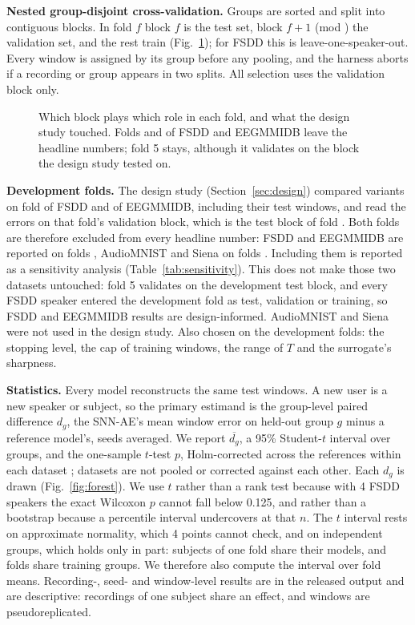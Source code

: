 \documentclass[conference]{IEEEtran}
\begin{document}
\par \textbf{Nested group-disjoint cross-validation.} Groups are sorted and split into \cfgFolds{}
contiguous blocks. In fold $f$ block $f$ is the test set, block $f{+}1$ (mod \cfgFolds) the
validation set, and the rest train (Fig.~\ref{fig:folds}); for FSDD this is
leave-one-speaker-out. Every window is assigned by its group before any pooling, and the harness
aborts if a recording or group appears in two splits. All selection uses the validation block
only.

\begin{figure}[!t]
  \centering
  
  \caption{Which block plays which role in each fold, and what the design study touched. Folds
  \cfgDevFoldsFsdd{} and \cfgDesignFoldsFsdd{} of FSDD and EEGMMIDB leave the headline numbers;
  fold 5 stays, although it validates on the block the design study tested on.}
  \label{fig:folds}
\end{figure}

\par \textbf{Development folds.} The design study (Section~\ref{sec:design}) compared variants
on fold \cfgDevFoldsFsdd{} of FSDD and of EEGMMIDB, including their test windows, and read the
errors on that fold's validation block, which is the test block of fold \cfgDesignFoldsFsdd.
Both folds are therefore excluded from every headline number: FSDD and EEGMMIDB are reported on
folds \cfgHeadlineFoldsFsdd, AudioMNIST and Siena on folds \cfgHeadlineFoldsSiena. Including them
is reported as a sensitivity analysis (Table~\ref{tab:sensitivity}). This does not make those
two datasets untouched: fold 5 validates on the development test block, and every FSDD speaker
entered the development fold as test, validation or training, so FSDD and EEGMMIDB results are
design-informed. AudioMNIST and Siena were not used in the design study. Also chosen on the
development folds: the stopping level, the cap of \cfgTrainWindows{} training windows, the range
of $T$ and the surrogate's sharpness.

\par \textbf{Statistics.} Every model reconstructs the same test windows. A new user is a new
speaker or subject, so the primary estimand is the group-level paired difference $d_g$, the
SNN-AE's mean window error on held-out group $g$ minus a reference model's, seeds averaged. We
report $\overline{d_g}$, a 95\% Student-$t$ interval over groups, and the one-sample $t$-test
$p$, Holm-corrected across the \cfgHolmRefs{} references within each dataset
\cite{holm1979simple}; datasets are not pooled or corrected against each other. Each $d_g$ is
drawn (Fig.~\ref{fig:forest}). We use $t$ rather than a rank test because with 4 FSDD speakers
the exact Wilcoxon $p$ cannot fall below 0.125, and rather than a bootstrap because a percentile
interval undercovers at that $n$. The $t$ interval rests on approximate normality, which 4 points
cannot check, and on independent groups, which holds only in part: subjects of one fold share
their models, and folds share training groups. We therefore also compute the interval over fold
means. Recording-, seed- and window-level results are in the released output and are
descriptive: recordings of one subject share an effect, and windows are pseudoreplicated.
\end{document}
